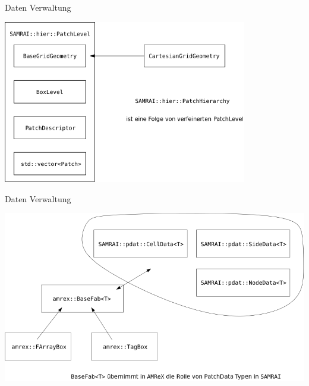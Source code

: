 \documentclass[ucs,9pt]{beamer}
\begin{document}
\begin{frame}{Daten Verwaltung}
\begin{center}
\includegraphics[width=0.8\textwidth]{patch_hierarchy}
\end{center}
\end{frame}

\begin{frame}{Daten Verwaltung}
\begin{center}
\includegraphics[width=\textwidth]{BaseFab}
\end{center}
\end{frame}
\end{document}
